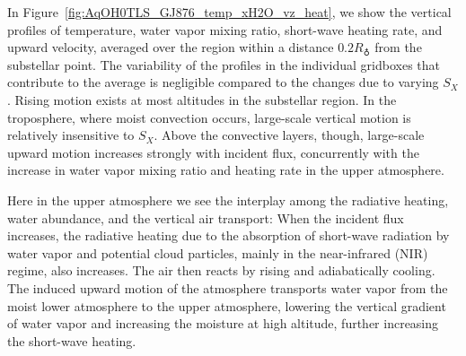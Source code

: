 \documentclass[11pt,numberedappendix,twocolappendix,]{emulateapj}
\def\wv{water vapor}
\begin{document}
In Figure~\ref{fig:AqOH0TLS_GJ876_temp_xH2O_vz_heat}, we show the vertical profiles of temperature, \wv{} mixing ratio, short-wave heating rate, and upward velocity, averaged over the region within a distance $0.2R_\earth$ from the substellar point. 
The variability of the profiles in the individual gridboxes that contribute to the average is negligible compared to the changes due to varying $S_X$. 
%
Rising motion exists at most altitudes in the substellar region.  In the troposphere, where moist convection occurs, large-scale vertical motion is relatively insensitive to $S_X$.  Above the convective layers, though, large-scale upward motion increases strongly with incident flux, concurrently with the increase in \wv{} mixing ratio and heating rate in the upper atmosphere. 

Here in the upper atmosphere we see the interplay among the radiative heating, water abundance, and the vertical air transport:  
When the incident flux increases, the radiative heating due to the absorption of short-wave radiation by \wv{} and potential cloud particles, mainly in the near-infrared (NIR) regime, also increases. %
The air then reacts by rising and adiabatically cooling. %
The induced upward motion of the atmosphere transports water vapor from the moist lower atmosphere to the upper atmosphere, lowering the vertical gradient of water vapor and increasing the moisture at high altitude, further increasing the short-wave heating. 
\end{document}
